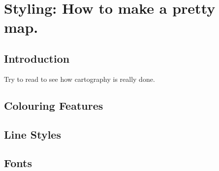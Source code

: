 \chapter{Styling: How to make a pretty map.}\label{styling}
\section{Introduction}
Try to read \cite{Peterson2012} to see how cartography is really done.
\section{Colouring Features}
\section{Line Styles}
\section{Fonts}
